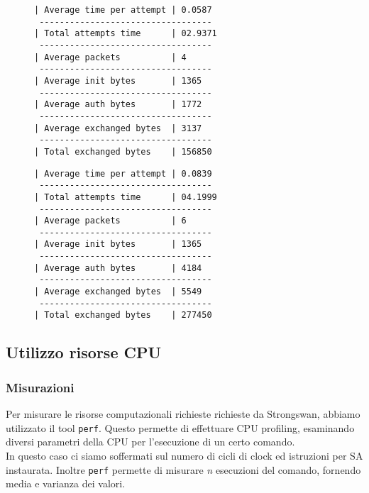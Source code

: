 \documentclass[
10pt, %
a4paper, %
oneside, %
headinclude,footinclude, %
BCOR5mm, %
]{scrartcl}
\begin{document}
\begin{figure}[ht]
    \begin{minipage}{0.45\textwidth}
      \begin{lstlisting}[caption=Risultati ECDSA]
| Average time per attempt | 0.0587 
 ----------------------------------
| Total attempts time      | 02.9371
 ----------------------------------
| Average packets          | 4 
 ----------------------------------
| Average init bytes       | 1365 
 ----------------------------------
| Average auth bytes       | 1772 
 ----------------------------------
| Average exchanged bytes  | 3137 
 ----------------------------------
| Total exchanged bytes    | 156850
      \end{lstlisting}
    \end{minipage}\hfill
    \begin{minipage}{0.45\textwidth}
      \begin{lstlisting}[caption=Risultati RSA]
| Average time per attempt | 0.0839
 ----------------------------------
| Total attempts time      | 04.1999
 ----------------------------------
| Average packets          | 6 
 ----------------------------------
| Average init bytes       | 1365 
 ----------------------------------
| Average auth bytes       | 4184 
 ----------------------------------
| Average exchanged bytes  | 5549 
 ----------------------------------
| Total exchanged bytes    | 277450
      \end{lstlisting}
    \end{minipage}
  \end{figure}


\subsection{Utilizzo risorse CPU}

\subsubsection{Misurazioni}

Per misurare le risorse computazionali richieste richieste da Strongswan, abbiamo utilizzato il tool \lstinline|perf|.
Questo permette di effettuare CPU profiling, esaminando diversi parametri della CPU per l'esecuzione di un certo comando.
\\
In questo caso ci siamo soffermati sul numero di cicli di clock ed istruzioni per SA instaurata.
Inoltre \lstinline|perf| permette di misurare \textit{n} esecuzioni del comando, fornendo media e varianza dei valori.
\end{document}
